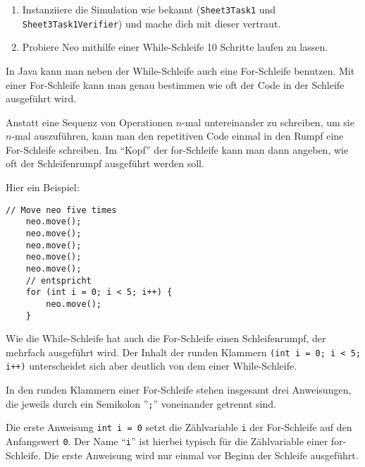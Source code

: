 
\begin{enumerate}
	\item Instanziiere die Simulation wie bekannt (\lstinline{Sheet3Task1} und \lstinline{Sheet3Task1Verifier}) und mache dich mit dieser vertraut.
	\item Probiere Neo mithilfe einer While-Schleife 10 Schritte laufen zu lassen.\\

\end{enumerate}


\begin{Infobox}
	In Java kann man neben der While-Schleife auch eine For-Schleife benutzen.
	Mit einer For-Schleife kann man genau bestimmen wie oft der Code in der Schleife ausgeführt wird.\newline

	Anstatt eine Sequenz von Operationen $n$-mal untereinander zu schreiben, um sie $n$-mal auszuführen, kann man den repetitiven Code einmal in den Rumpf eine For-Schleife schreiben.
	Im \enquote{Kopf} der for-Schleife kann man dann angeben, wie oft der Schleifenrumpf ausgeführt werden soll.\newline

	Hier ein Beispiel:

	\begin{lstlisting}[numbers=none]
	// Move neo five times
	neo.move();
	neo.move();
	neo.move();
	neo.move();
	neo.move();
	// entspricht
	for (int i = 0; i < 5; i++) {
		neo.move();
	}
	\end{lstlisting}

	Wie die While-Schleife hat auch die For-Schleife einen Schleifenrumpf, der mehrfach ausgeführt wird.
	Der Inhalt der runden Klammern \lstinline{(int i = 0; i < 5; i++)} unterscheidet sich aber deutlich von dem einer While-Schleife.\newline

	In den runden Klammern einer For-Schleife stehen insgesamt drei Anweisungen, die jeweils durch ein Semikolon ''\lstinline{;}'' voneinander getrennt sind.

	Die erste Anweisung \lstinline{int i = 0} setzt die Zählvariable \lstinline{i} der For-Schleife auf den Anfangswert \lstinline{0}.
	Der Name \enquote{\lstinline{i}} ist hierbei typisch für die Zählvariable einer for-Schleife.
	Die erste Anweisung wird nur einmal vor Beginn der Schleife ausgeführt.\newline


\end{Infobox}
